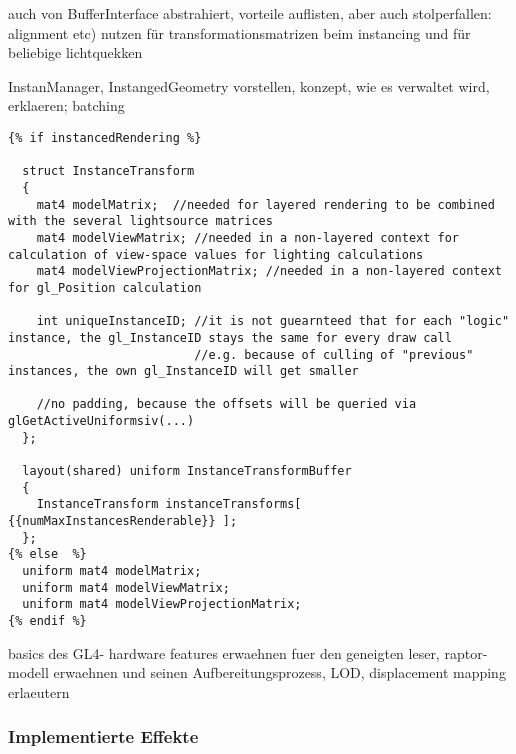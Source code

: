 	auch von BufferInterface abstrahiert, vorteile auflisten, aber auch stolperfallen: alignment etc)	
	nutzen für transformationsmatrizen beim instancing und für beliebige lichtquekken

	
	InstanManager, InstangedGeometry vorstellen, konzept, wie es verwaltet wird, erklaeren;
	batching
 	\lstset{language=GLSL}
 	\begin{lstlisting}[caption={Transformationsmatrizen-Uniforms im Vertex Shader},label=listing:VertShaderTransformDef]
{% if instancedRendering %}

  struct InstanceTransform
  {
    mat4 modelMatrix;  //needed for layered rendering to be combined with the several lightsource matrices
    mat4 modelViewMatrix; //needed in a non-layered context for calculation of view-space values for lighting calculations
    mat4 modelViewProjectionMatrix; //needed in a non-layered context for gl_Position calculation
    
    int uniqueInstanceID; //it is not guearnteed that for each "logic" instance, the gl_InstanceID stays the same for every draw call
                          //e.g. because of culling of "previous" instances, the own gl_InstanceID will get smaller 
    
    //no padding, because the offsets will be queried via glGetActiveUniformsiv(...)
  };

  layout(shared) uniform InstanceTransformBuffer
  {
    InstanceTransform instanceTransforms[  {{numMaxInstancesRenderable}} ];
  };
{% else  %}
  uniform mat4 modelMatrix;
  uniform mat4 modelViewMatrix;
  uniform mat4 modelViewProjectionMatrix; 
{% endif %}
 	\end{lstlisting}
 	\lstset{language=C++} %
	
	
	
	basics des GL4- hardware features erwaehnen fuer den geneigten leser, raptor-modell erwaehnen und seinen 		
	Aufbereitungsprozess, LOD, displacement mapping erlaeutern	
	
	
\subsubsection{Implementierte Effekte}
	\label{sec:genericVisualEffects}

